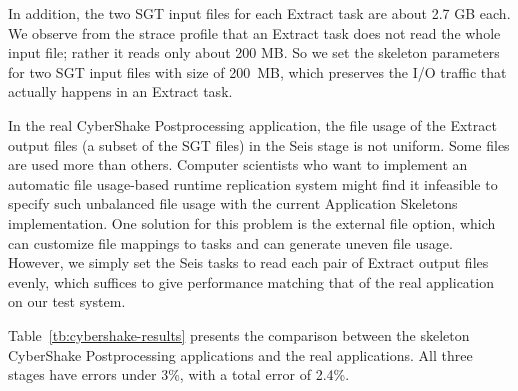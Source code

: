 \documentclass[preprint,12pt]{elsarticle}
\newcommand{\katznote}[1]{ {\textcolor{blue}    { ***Dan:   #1 }}}
\newcommand{\zhaonote}[1]{{\textcolor{cyan}{ ***Zhao:  #1 }}}
\newcommand{\katznote}[1]{}
\newcommand{\zhaonote}[1]{}
\begin{document}
In addition, the two SGT input files for each Extract task are about 2.7 GB each. %
We observe from the strace profile that
an Extract task does not read the whole input file; rather it reads only  about 200 MB. So we %
set the skeleton parameters for two SGT input
files with  size of 200~MB, which %
preserves the I/O traffic that actually happens
in an Extract task. 

In the real CyberShake Postprocessing application, the file usage of the Extract output files (a subset of the SGT files) in the Seis stage is not uniform. Some files are used more than  others. Computer scientists who want to implement an automatic file usage-based runtime 
replication system might find it infeasible to specify such unbalanced file usage with the current Application Skeletons implementation. One
solution for this problem is the external file option, which can customize file mappings to tasks and  can generate
uneven file usage.
However, we simply set the Seis tasks to read each pair of Extract output files evenly, which suffices to give performance matching that of the real application on our test system.

Table~\ref{tb:cybershake-results} presents the comparison between the skeleton CyberShake Postprocessing applications and the real applications. 
All three stages have errors under 3\%, with a total error of 2.4\%.
\end{document}
